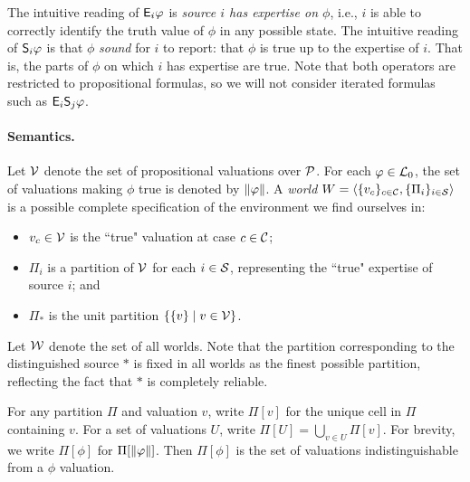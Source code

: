 The intuitive reading of $\E_i\phi$ is {\em source $i$ has expertise on
$\phi$}, i.e., $i$ is able to correctly identify the truth value of $\phi$ in
any possible state. The intuitive reading of $\S_i\phi$ is that $\phi$
\emph{sound} for $i$ to report: that $\phi$ is true up to the
expertise of $i$. That is, the parts of $\phi$ on which $i$ has expertise are
true. Note that both operators are restricted to propositional
formulas, so we will not consider iterated formulas such as $\E_i\S_j\phi$.

\paragraph{Semantics.}

Let $\vals$ denote the set of propositional valuations over $\propvars$. For
each $\phi \in \lprop$, the set of valuations making $\phi$ true is denoted by
$\propmods{\phi}$. A \emph{world} $W = \tuple{\{v_c\}_{c \in \C}, \{\Pi_i\}_{i
\in \srcs}}$ is a possible complete specification of the environment we find
ourselves in:
\begin{itemize}
    \item $v_c \in \vals$ is the ``true" valuation at case $c \in \C$;
    \item $\Pi_i$ is a partition of $\vals$ for each $i \in \srcs$, representing
          the ``true" expertise of source $i$; and
    \item $\Pi_\ast$ is the unit partition $\{\{v\} \mid v \in \vals\}$.
\end{itemize}
Let $\W$ denote the set of all worlds.  Note that the partition corresponding
to the distinguished source $\ast$ is fixed in all worlds as the finest
possible partition, reflecting the fact that $\ast$ is completely reliable.

For any partition $\Pi$ and valuation $v$, write $\Pi[v]$ for the unique cell
in $\Pi$ containing $v$. For a set of valuations $U$, write $\Pi[U] =
\bigcup_{v \in U}{\Pi[v]}$. For brevity, we write $\Pi[\phi]$ for
$\Pi[\propmods{\phi}]$. Then $\Pi[\phi]$ is the set of valuations
indistinguishable from a $\phi$ valuation.

